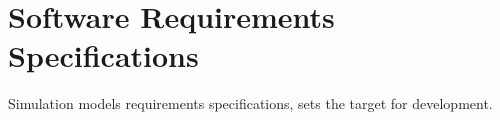 
\chapter{Software Requirements Specifications}

Simulation models requirements specifications, sets the target for
development.

